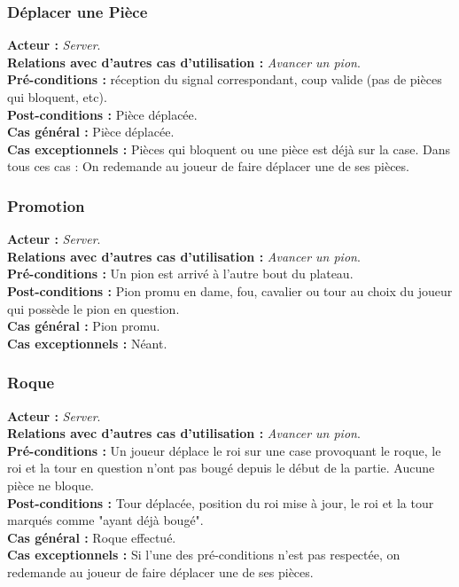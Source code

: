 \documentclass[10pt, a4paper]{article}
\begin{document}
\subsubsection{Déplacer une Pièce}
\textbf{Acteur :} \textit{Server}. \\
\textbf{Relations avec d'autres cas d'utilisation :} {\itshape Avancer un pion}. \\
\textbf{Pré-conditions :} réception du signal correspondant, coup valide (pas de pièces qui bloquent, etc). \\
\textbf{Post-conditions :} Pièce déplacée. \\
\textbf{Cas général :} Pièce déplacée. \\
\textbf{Cas exceptionnels :} Pièces qui bloquent ou une pièce est déjà sur la case. Dans tous ces cas : On redemande au joueur de faire déplacer une de ses pièces. \\

\subsubsection{Promotion}
\textbf{Acteur :} \textit{Server}. \\
\textbf{Relations avec d'autres cas d'utilisation :} {\itshape Avancer un pion}. \\
\textbf{Pré-conditions :} Un pion est arrivé à l'autre bout du plateau. \\
\textbf{Post-conditions :} Pion promu en dame, fou, cavalier ou tour au choix du joueur qui possède le pion en question. \\
\textbf{Cas général :} Pion promu. \\
\textbf{Cas exceptionnels :} Néant. \\

\subsubsection{Roque}
\textbf{Acteur :} \textit{Server}. \\
\textbf{Relations avec d'autres cas d'utilisation :} {\itshape Avancer un pion}. \\
\textbf{Pré-conditions :} Un joueur déplace le roi sur une case provoquant le roque, le roi et la tour en question n'ont pas bougé depuis le début de la partie. Aucune pièce ne bloque. \\
\textbf{Post-conditions :} Tour déplacée, position du roi mise à jour, le roi et la tour marqués comme "ayant déjà bougé". \\
\textbf{Cas général :} Roque effectué. \\
\textbf{Cas exceptionnels :} Si l'une des pré-conditions n'est pas respectée, on redemande au joueur de faire déplacer une de ses pièces. \\
\end{document}
